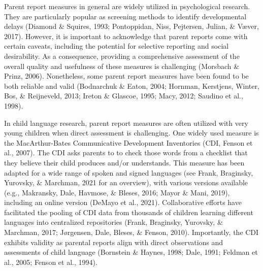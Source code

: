 \documentclass[
  man,floatsintext]{apa6}
\begin{document}
Parent report measures in general are widely utilized in psychological research. They are particularly popular as screening methods to identify developmental delays (Diamond \& Squires, 1993; Pontoppidan, Niss, Pejtersen, Julian, \& Væver, 2017). However, it is important to acknowledge that parent reports come with certain caveats, including the potential for selective reporting and social desirability. As a consequence, providing a comprehensive assessment of the overall quality and usefulness of these measures is challenging (Morsbach \& Prinz, 2006). Nonetheless, some parent report measures have been found to be both reliable and valid (Bodnarchuk \& Eaton, 2004; Hornman, Kerstjens, Winter, Bos, \& Reijneveld, 2013; Ireton \& Glascoe, 1995; Macy, 2012; Saudino et al., 1998).

In child language research, parent report measures are often utilized with very young children when direct assessment is challenging. One widely used measure is the MacArthur-Bates Communicative Development Inventories (CDI, Fenson et al., 2007). The CDI asks parents to to check those words from a checklist that they believe their child produces and/or understands. This measure has been adapted for a wide range of spoken and signed languages (see Frank, Braginsky, Yurovsky, \& Marchman, 2021 for an overview), with various versions available (e.g., Makransky, Dale, Havmose, \& Bleses, 2016; Mayor \& Mani, 2019), including an online version (DeMayo et al., 2021). Collaborative efforts have facilitated the pooling of CDI data from thousands of children learning different languages into centralized repositories (Frank, Braginsky, Yurovsky, \& Marchman, 2017; Jørgensen, Dale, Bleses, \& Fenson, 2010). Importantly, the CDI exhibits validity as parental reports align with direct observations and assessments of child language (Bornstein \& Haynes, 1998; Dale, 1991; Feldman et al., 2005; Fenson et al., 1994).
\end{document}
